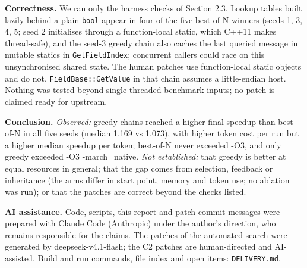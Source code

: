 \documentclass[10pt,a4paper]{article}
\begin{document}
\textbf{Correctness.} We ran only the harness checks of Section 2.3. Lookup tables built lazily behind a plain \texttt{bool} appear in four of the five best-of-N winners (seeds 1, 3, 4, 5; seed 2 initialises through a function-local static, which C++11 makes thread-safe), and the seed-3 greedy chain also caches the last queried message in mutable statics in \texttt{GetFieldIndex}; concurrent callers could race on this unsynchronised shared state. The human patches use function-local static objects and do not. \texttt{FieldBase::GetValue} in that chain assumes a little-endian host. Nothing was tested beyond single-threaded benchmark inputs; no patch is claimed ready for upstream.

\textbf{Conclusion.} \emph{Observed:} greedy chains reached a higher final speedup than best-of-N in all five seeds (median 1.169 vs 1.073), with higher token cost per run but a higher median speedup per token; best-of-N never exceeded -O3, and only greedy exceeded -O3 -march=native. \emph{Not established:} that greedy is better at equal resources in general; that the gap comes from selection, feedback or inheritance (the arms differ in start point, memory and token use; no ablation was run); or that the patches are correct beyond the checks listed.

\textbf{AI assistance.} Code, scripts, this report and patch commit messages were prepared with Claude Code (Anthropic) under the author's direction, who remains responsible for the claims. The patches of the automated search were generated by deepseek-v4.1-flash; the C2 patches are human-directed and AI-assisted. Build and run commands, file index and open items: \texttt{DELIVERY.md}.



\end{document}
